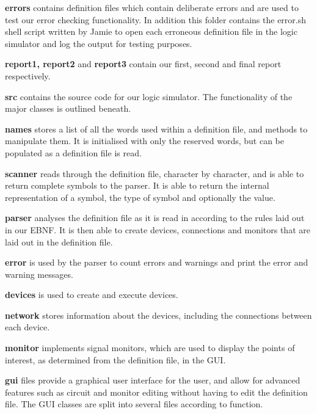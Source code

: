 \documentclass[a4paper,10pt]{article}
\begin{document}
\textbf{errors} contains definition files which contain deliberate errors and are used to test our error checking functionality. In addition this folder contains the error.sh shell script written by Jamie to open each erroneous definition file in the logic simulator and log the output for testing purposes.

\textbf{report1, report2} and \textbf{report3} contain our first, second and final report respectively.

\textbf{src} contains the source code for our logic simulator. The functionality of the major classes is outlined beneath.

\textbf{names} stores a list of all the words used within a definition file, and methods to manipulate them. It is initialised with only the reserved words, but can be populated as a definition file is read.

\textbf{scanner} reads through the definition file, character by character, and is able to return complete symbols to the parser. It is able to return the internal representation of a symbol, the type of symbol and optionally the value.

\textbf{parser} analyses the definition file as it is read in according to the rules laid out in our EBNF. It is then able to create devices, connections and monitors that are laid out in the definition file.

\textbf{error} is used by the parser to count errors and warnings and print the error and warning messages. 

\textbf{devices} is used to create and execute devices. 

\textbf{network} stores information about the devices, including the connections between each device.

\textbf{monitor} implements signal monitors, which are used to display the points of interest, as determined from the definition file, in the GUI.

\textbf{gui} files provide a graphical user interface for the user, and allow for advanced features such as circuit and monitor editing without having to edit the definition file. The GUI classes are split into several files according to function. 
\end{document}
